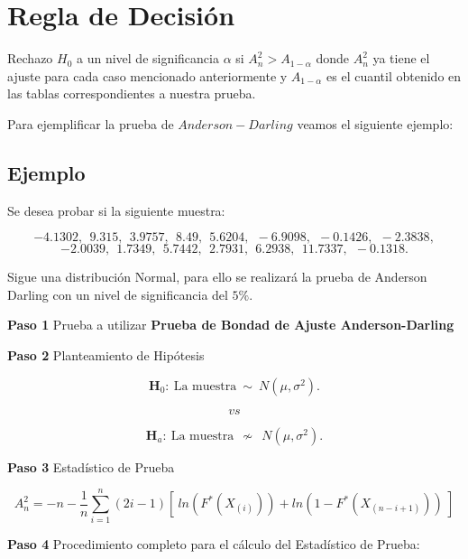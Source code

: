 \documentclass[
  a4paper,
  oneside,
  openany]{book}
\begin{document}
\hypertarget{regla-de-decisiuxf3n-34}{%
\section{Regla de Decisión}\label{regla-de-decisiuxf3n-34}}

Rechazo \(H_0\) a un nivel de significancia \(\alpha\) si \(A_{n}^2> A_{1-\alpha}\) donde \(A_{n}^{2}\) ya tiene el ajuste para cada caso mencionado anteriormente y \(A_{1-\alpha}\) es el cuantil obtenido en las tablas correspondientes a nuestra prueba.

Para ejemplificar la prueba de \(Anderson-Darling\) veamos el siguiente ejemplo:

\hypertarget{ejemplo-16}{%
\subsection{Ejemplo}\label{ejemplo-16}}

Se desea probar si la siguiente muestra:

\[-4.1302,\ \ 9.315,\ \ 3.9757,\ \ 8.49,\ \ 5.6204,\ \ -6.9098,\ \ -0.1426,\ \ -2.3838,\]
\[-2.0039,\ \ 1.7349,\ \ 5.7442,\ \ 2.7931,\ \ 6.2938,\ \ 11.7337,\ \ -0.1318.\]

Sigue una distribución Normal, para ello se realizará la prueba de Anderson Darling con un nivel de significancia del \(5\%\).

\textbf{Paso 1} Prueba a utilizar \textbf{Prueba de Bondad de Ajuste Anderson-Darling}

\textbf{Paso 2} Planteamiento de Hipótesis

\[\textbf{H}_0: \ \mbox{La muestra} \ \sim \  N(\mu,\sigma^2).\]

\[vs\]

\[\textbf{H}_a: \ \mbox{La muestra} \ \ \nsim \ \  N(\mu,\sigma^2).\]

\textbf{Paso 3} Estadístico de Prueba

\[A_n^2=-n-\frac{1}{n}\sum_{i=1}^{n}\left(2i-1\right)[ \ ln(F^*(X_{(i)})) +ln(1-F^*(X_{(n-i+1)})) \ ]\]

\textbf{Paso 4} Procedimiento completo para el cálculo del Estadístico de Prueba:
\end{document}
